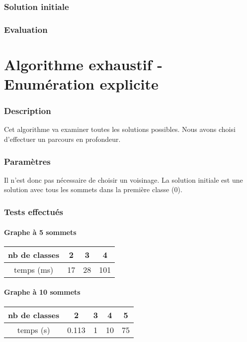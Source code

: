 \documentclass[12pt]{article}
\begin{document}
\section{Solution initiale}
\section{Evaluation}

\newpage

\part{Algorithme exhaustif - Enumération explicite}

\section{Description}
Cet algorithme va examiner toutes les solutions possibles. Nous avons choisi d'effectuer un parcours en profondeur.

\section{Paramètres}
Il n’est donc pas nécessaire de choisir un voisinage. La solution initiale est une solution avec tous les sommets dans la première classe (0).

\section{Tests effectués}

\subsection{Graphe à 5 sommets}

\begin{tabular}{|c|c|c|c|}
	\hline 
	nb de classes & 2 & 3 & 4 \\
	\hline
	temps (ms) & 17 & 28 & 101 \\
	\hline
\end{tabular}

\subsection{Graphe à 10 sommets}

\begin{tabular}{|c|c|c|c|c|}
	\hline 
	nb de classes & 2 & 3 & 4 & 5 \\
	\hline
	temps (s) & 0.113 & 1 & 10 & 75 \\
	\hline
\end{tabular}
\end{document}
